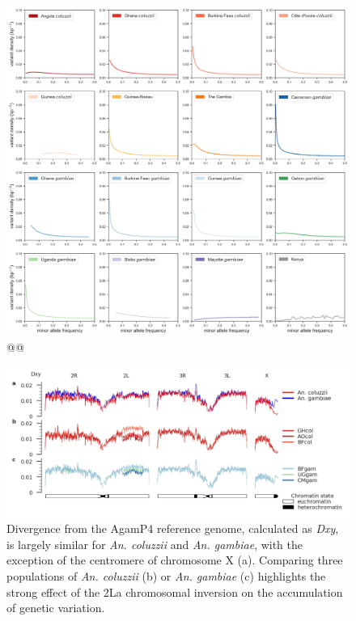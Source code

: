 \documentclass[a4paper,11pt,abstracton,hidelinks]{scrartcl}
\begin{document}
\begin{figure}[H]
	\begin{center}
		\includegraphics*[width=6.3in]{artwork/sfs_supplementary_large.jpg}
	\end{center}
	\caption{@@}
	\label{div}
\end{figure}

\clearpage

\begin{figure}[H]
	\begin{center}
		\includegraphics*[width=6.3in]{notebooks/refdiff/refdiff_phase2_combined.jpg}
	\end{center}
	\caption{Divergence from the AgamP4 reference genome, calculated as \textit{Dxy}, is largely similar for \textit{An. coluzzii} and \textit{An. gambiae}, with the exception of the centromere of chromosome X (a). Comparing three populations of \textit{An. coluzzii} (b) or \textit{An. gambiae} (c) highlights the strong effect of the 2La chromosomal inversion on the accumulation of genetic variation.}
	\label{refdiff}
\end{figure}
\end{document}
